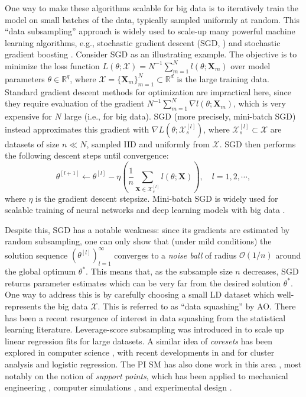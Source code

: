 \documentclass[11pt]{NSFamsart}
\newcommand{\bX}{{\boldsymbol{X}}}
\begin{document}
One way to make these algorithms scalable for big data is to iteratively train the model on small batches of the data, typically sampled uniformly at random. This ``data subsampling'' approach is widely used to scale-up many powerful machine learning algorithms, e.g., stochastic gradient descent (SGD, \cite{Bot2010}) and stochastic gradient boosting \cite{friedman2002stochastic}. Consider SGD as an illustrating example. The objective is to minimize the loss function $L(\theta;\mathcal{X}) = N^{-1} \sum_{m=1}^N l(\theta;\bX_m)$ over model parameters $\theta \in \mathbb{R}^q$, where $\mathcal{X} = \{\bX_m\}_{m=1}^N \subset \mathbb{R}^d$ is the large training data. Standard gradient descent methods for optimization \cite{nocedal2006numerical} are impractical here, since they require evaluation of the gradient $N^{-1} \sum_{m=1}^N \nabla l(\theta;\bX_m)$, which is very expensive for $N$ large (i.e., for big data). SGD \cite{Bot2010} (more precisely, mini-batch SGD) instead approximates this gradient with $\nabla L(\theta;\mathcal{X}_{s}^{[l]})$, where $\mathcal{X}_{s}^{[l]} \subset \mathcal{X}$ are datasets of size $n \ll N$, sampled IID and uniformly from $\mathcal{X}$. SGD then performs the following descent steps until convergence:
\begin{equation}\label{eq:sgdopt}
\theta^{[l+1]} \leftarrow \theta^{[l]} - \eta \left( \frac{1}{n} \sum_{\bX \in \mathcal{X}_{s}^{[l]}} l(\theta;\bX)\right) , \quad l = 1, 2, \cdots,
\end{equation}
where $\eta$ is the gradient descent stepsize. Mini-batch SGD is widely used for scalable training of neural networks and deep learning models with big data \citep{srivastava2014dropout}.

Despite this, SGD has a notable weakness: since its gradients are estimated by random subsampling, one can only show that (under mild conditions) the solution sequence $(\theta^{[l]})_{l=1}^\infty$ converges to a \textit{noise ball} of radius $\mathcal{O}(1/n)$ around the global optimum $\theta^*$. This means that, as the subsample size $n$ decreases, SGD returns parameter estimates which can be very far from the desired solution $\theta^*$. One way to address this is by carefully choosing a small LD dataset which well-represents the big data $\mathcal{X}$. This is referred to as ``data squashing'' \cite{owen2003data} by \hypertarget{AOlink}{AO}. There has been a recent resurgence of interest in data squashing from the statistical learning literature. Leverage-score subsampling was introduced in \cite{ma2015statistical} to scale up linear regression fits for large datasets. A similar idea of \textit{coresets} has been explored in computer science \cite{chan2006faster}, with recent developments in \cite{bachem2017practical} and \cite{huggins2016coresets} for cluster analysis and logistic regression. The PI \hypertarget{SMlink}{SM} has also done work in this area \cite{mak2018support,mak2018minimax,mak2017projected,krishna2019distributional}, most notably on the notion of \textit{support points}, which has been applied to mechanical engineering \cite{fernandez2018estimating}, computer simulations \citep{pronzato2020bayesian}, and experimental design \cite{krishna2020robust}.
\end{document}

